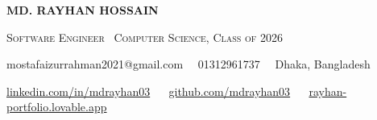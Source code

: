 \documentclass[a4paper,10pt]{article}
\newcommand{\dotsep}{\ \textperiodcentered\ }
\begin{document}
\begin{center}
  {\Huge\bfseries MD. RAYHAN HOSSAIN}\par\vspace{4pt}
  {\large\color{accent}\scshape Software Engineer \textbar\ Computer Science, Class of 2026}\par\vspace{6pt}
  {\small mostafaizurrahman2021@gmail.com \dotsep 01312961737 \dotsep Dhaka, Bangladesh}\par\vspace{2.5pt}
  {\small \href{https://www.linkedin.com/in/mdrayhan03/}{linkedin.com/in/mdrayhan03} \dotsep
          \href{https://github.com/mdrayhan03}{github.com/mdrayhan03} \dotsep
          \href{https://rayhan-portfolio.lovable.app}{rayhan-portfolio.lovable.app}}
\end{center}
\vspace{2pt}
\end{document}
